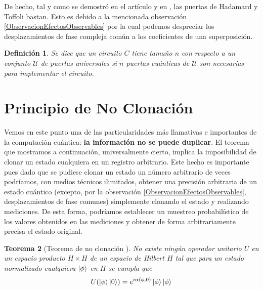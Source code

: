 \documentclass[11pt, spanish]{report}
\numberwithin{equation}{section}
\newtheorem{defin}{Definición}[section]
\newtheorem{teo}[defin]{Teorema}
\numberwithin{defin}{section}
\newenvironment{purpleBox}{\begin{tcolorbox}[colback=purple!3!white,colframe=purple!75!black]}{\end{tcolorbox}}
\begin{document}
\begin{appendices}
De hecho, tal y como se demostró en el artículo \cite{2002quant.ph..5115S} y en \cite{2003quant.ph..1040A}, las puertas de Hadamard y Toffoli bastan. Esto es debido a la mencionada observación \ref{ObservacionEfectosObservables} por la cual podemos despreciar los desplazamientos de fase compleja común a los coeficientes de una superposición.\\


\begin{defin}Se dice que un circuito $C$ tiene tamaño $n$ con respecto a un conjunto $\mathcal{U}$ de puertas universales si $n$ puertas cuánticas de $\mathcal{U}$ son necesarias para implementar el circuito.
\end{defin} 


\section{Principio de No Clonación}\label{NC}

Vemos en este punto una de las particularidades más llamativas e importantes de la computación cuántica: \textbf{la información no se puede duplicar}. El teorema que mostramos a continuación, universalmente cierto, implica la imposibilidad de clonar un estado cualquiera en un registro arbitrario. Este hecho es importante pues dado que se pudiese clonar un estado un número arbitrario de veces podríamos, con medios técnicos ilimitados, obtener una precisión arbitraria de un estado cuántico (excepto, por la observación \ref{ObservacionEfectosObservables}, desplazamientos de fase comunes) simplemente clonando el estado y realizando mediciones. De esta forma, podríamos establecer un muestreo probabilístico de los valores obtenidos en las mediciones y obtener de forma arbitrariamente precisa el estado original.\\

\begin{purpleBox}
\begin{teo}[Teorema de no clonación \cite{QuantumWhaley}] 
No existe ningún operador unitario $U$ en un espacio producto $H\times H$ de un espacio de Hilbert $H$ tal que para un estado normalizado cualquiera  $\ket{\phi}$ en $H$ se cumpla que
\begin{equation}
U(\ket{\phi}\ket{0})=e^{i\alpha(\phi,0)}\ket{\phi}\ket{\phi}
\end{equation}
\end{teo}
\end{purpleBox}


\end{appendices}
\end{document}

